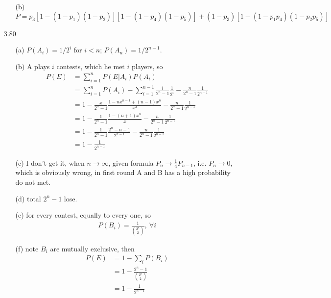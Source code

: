 \documentclass[paper=a4, fontsize=11pt]{scrartcl} %
\numberwithin{equation}{section} %
\numberwithin{figure}{section} %
\numberwithin{table}{section} %
\begin{document}
\begin{itemize}
\begin{itemize}
		\item[(b)] $P = p_3[1-(1-p_1)(1-p_2)][1-(1-p_4)(1-p_5)] + (1-p_3)[1-(1-p_1p_4)(1-p_2p_5)]$
	\end{itemize}
	\item[3.80]
	\begin{itemize}
		\item[(a)] $P(A_i)=1/2^i$ for $i<n$; $P(A_n)=1/2^{n-1}$.
		\item[(b)] A plays $i$ contests, which he met $i$ players, so
		\begin{align}
			P(E) &= \sum_{i=1}^n P(E|A_i)P(A_i) \\
				&= \sum_{i=1}^nP(A_i) - \sum_{i=1}^{n-1} \frac{i}{2^n-1} \frac{1}{2^i}-\frac{n}{2^n-1}\frac{1}{2^{n-1}} \\
				&= 1-\frac{x}{2^n-1} \frac{1-nx^{n-1}+(n-1)x^n}{x^2} -\frac{n}{2^n-1}\frac{1}{2^{n-1}} \\
				&= 1-\frac{1}{2^n-1} \frac{1-(n+1)x^n}{x} -\frac{n}{2^n-1}\frac{1}{2^{n-1}}\\
				&= 1-\frac{1}{2^n-1} \frac{2^n-n-1}{2^{n-1}} -\frac{n}{2^n-1}\frac{1}{2^{n-1}} \\
				&= 1- \frac{1}{2^{n-1}}
		\end{align}
		\item[(c)] I don't get it, when $n\rightarrow\infty$, given formula $P_n\rightarrow \frac{1}{4} P_{n-1}$, i.e. $P_n\rightarrow 0$, which is obviously wrong, in first round A and B has a high probability do not met.
		\item[(d)] total $2^n-1$ lose.
		\item[(e)] for every contest, equally to every one, so
		\begin{align}
			P(B_i) = \frac{1}{ {2^n\choose 2} },\ \forall i
		\end{align}
		\item[(f)] note $B_i$ are mutually exclusive, then
		\begin{align}
			P(E) &= 1 - \sum_i P(B_i) \\
				&= 1 - \frac{2^n -1 }{ {2^n\choose 2} }\\
				&= 1 - \frac{1}{2^{n-1}}
		\end{align}
	\end{itemize}
\end{itemize}
\end{document}
